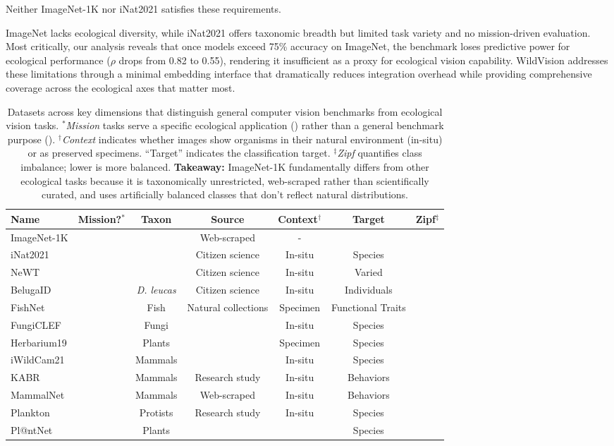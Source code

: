 \documentclass{article}
\newcommand{\cmark}{\ding{51}}
\newcommand{\xmark}{\ding{55}}
\begin{document}
Neither ImageNet-1K nor iNat2021 satisfies these requirements.
 
ImageNet lacks ecological diversity, while iNat2021 offers taxonomic breadth but limited task variety and no mission-driven evaluation. 
Most critically, our analysis reveals that once models exceed 75\% accuracy on ImageNet, the benchmark loses predictive power for ecological performance ($\rho$ drops from 0.82 to 0.55), rendering it insufficient as a proxy for ecological vision capability. WildVision addresses these limitations through a minimal embedding interface that dramatically reduces integration overhead while providing comprehensive coverage across the ecological axes that matter most.


\begin{table}[t]
    \centering
    \small
    \caption{Datasets across key dimensions that distinguish general computer vision benchmarks from ecological vision tasks. 
    $^*$\textit{Mission} tasks serve a specific ecological application (\cmark) rather than a general benchmark purpose (\xmark). 
    $^\dagger$\textit{Context} indicates whether images show organisms in their natural environment (in-situ) or as preserved specimens. ``Target'' indicates the classification target. 
    $^\ddagger$\textit{Zipf} quantifies class imbalance; lower is more balanced. 
    \textbf{Takeaway:} ImageNet-1K fundamentally differs from other ecological tasks because it is taxonomically unrestricted, web-scraped rather than scientifically curated, and uses artificially balanced classes that don't reflect natural distributions.}
    \label{tab:tasks}
    \begin{tabular}{lcccccc}
    \toprule
    Name & Mission?$^*$ & Taxon & Source & Context$^\dagger$ & Target & Zipf$^\ddagger$ \\
    \midrule
    ImageNet-1K & \xmark &  & Web-scraped & - &  &  \\
    iNat2021 & \xmark &  & Citizen science & In-situ & Species &  \\
    NeWT & \xmark &  & Citizen science & In-situ & Varied &  \\
    \midrule
    BelugaID & \cmark & \textit{D. leucas} & Citizen science & In-situ & Individuals &  \\
    FishNet & \xmark & Fish & Natural collections  & Specimen & Functional Traits &  \\
    FungiCLEF & \xmark & Fungi & & In-situ & Species &  \\
    Herbarium19 & \cmark & Plants & & Specimen & Species &  \\
    iWildCam21 & \cmark & Mammals & & In-situ & Species &  \\
    KABR & \cmark & Mammals & Research study & In-situ & Behaviors  & \\
    MammalNet & \xmark & Mammals & Web-scraped & In-situ & Behaviors & \\
    Plankton & \cmark & Protists & Research study & In-situ & Species & \\
    Pl@ntNet & \xmark & Plants & & & Species &  \\
    \bottomrule
    \end{tabular}
\end{table}
\end{document}
